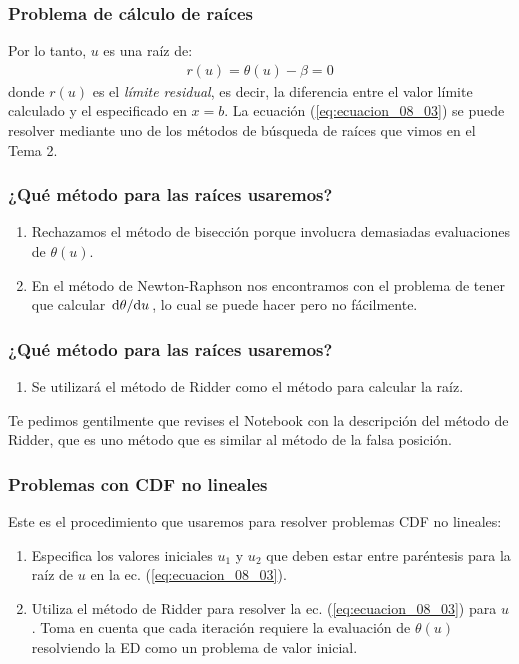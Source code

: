 \documentclass[12pt]{beamer}
\begin{document}
\begin{frame}
\frametitle{Problema de cálculo de raíces}
Por lo tanto, \pause $u$ es una raíz de:
\pause
\begin{align}
r (u) = \theta (u) - \beta = 0
\label{eq:ecuacion_08_03}
\end{align}
\pause
donde $r (u)$ es el \emph{límite residual}, es decir, la diferencia entre el valor límite calculado y el especificado en $x = b$. \pause La ecuación (\ref{eq:ecuacion_08_03}) se puede resolver mediante uno de los métodos de búsqueda de raíces que vimos en el Tema 2.
\end{frame}
\begin{frame}
\frametitle{¿Qué método para las raíces usaremos?}
\begin{enumerate}[<+->]
\item Rechazamos el método de bisección porque involucra demasiadas evaluaciones de $\theta (u)$.
\item En el método de Newton-Raphson nos encontramos con el problema de tener que calcular $\dv*{\theta}{u}$, lo cual se puede hacer pero no fácilmente.
\seti
\end{enumerate}
\end{frame}
\begin{frame}
\frametitle{¿Qué método para las raíces usaremos?}
\begin{enumerate}[<+->]
\conti
\item Se utilizará el método de Ridder como el método para calcular la raíz.
\end{enumerate}
\pause
Te pedimos gentilmente que revises el Notebook con la descripción del método de Ridder, que es uno método que es similar al método de la falsa posición.
\end{frame}
\begin{frame}
\frametitle{Problemas con CDF no lineales}
Este es el procedimiento que usaremos para resolver problemas CDF no lineales:
\pause
{}
\begin{enumerate}[<+->]
\item Especifica los valores iniciales $u_{1}$ y $u_{2}$ que deben estar entre paréntesis para la raíz de $u$ en la ec. (\ref{eq:ecuacion_08_03}).
\item Utiliza el método de Ridder para resolver la ec. (\ref{eq:ecuacion_08_03}) para $u$. Toma en cuenta que cada iteración requiere la evaluación de $\theta (u)$ resolviendo la ED como un problema de valor inicial.
\seti
\end{enumerate}
\end{frame}
\end{document}
